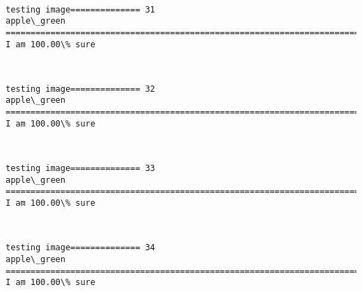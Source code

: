 \documentclass[11pt]{article}
\begin{document}
    \begin{center}
    \end{center}
    { \hspace*{\fill} \\}
    
    \begin{Verbatim}[commandchars=\\\{\}]
testing image============== 31
apple\_green
============================================================================
I am 100.00\% sure

    \end{Verbatim}

    \begin{center}
    \end{center}
    { \hspace*{\fill} \\}
    
    \begin{Verbatim}[commandchars=\\\{\}]
testing image============== 32
apple\_green
============================================================================
I am 100.00\% sure

    \end{Verbatim}

    \begin{center}
    \end{center}
    { \hspace*{\fill} \\}
    
    \begin{Verbatim}[commandchars=\\\{\}]
testing image============== 33
apple\_green
============================================================================
I am 100.00\% sure

    \end{Verbatim}

    \begin{center}
    \end{center}
    { \hspace*{\fill} \\}
    
    \begin{Verbatim}[commandchars=\\\{\}]
testing image============== 34
apple\_green
============================================================================
I am 100.00\% sure

    \end{Verbatim}
\end{document}
